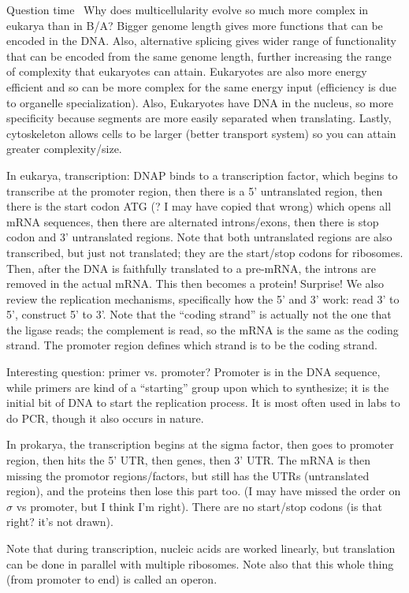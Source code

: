 \documentclass[12pt]{article}
\begin{document}
Question time~ Why does multicellularity evolve so much more complex in eukarya than in B/A? Bigger genome length gives more functions that can be encoded in the DNA. Also, alternative splicing gives wider range of functionality that can be encoded from the same genome length, further increasing the range of complexity that eukaryotes can attain. Eukaryotes are also more energy efficient and so can be more complex for the same energy input (efficiency is due to organelle specialization). Also, Eukaryotes have DNA in the nucleus, so more specificity because segments are more easily separated when translating. Lastly, cytoskeleton allows cells to be larger (better transport system) so you can attain greater complexity/size.

In eukarya, transcription: DNAP binds to a transcription factor, which begins to transcribe at the promoter region, then there is a 5' untranslated region, then there is the start codon ATG (? I may have copied that wrong) which opens all mRNA sequences, then there are alternated introns/exons, then there is stop codon and 3' untranslated regions. Note that both untranslated regions are also transcribed, but just not translated; they are the start/stop codons for ribosomes. Then, after the DNA is faithfully translated to a pre-mRNA, the introns are removed in the actual mRNA. This then becomes a protein! Surprise! We also review the replication mechanisms, specifically how the 5' and 3' work: read 3' to 5', construct 5' to 3'. Note that the ``coding strand'' is actually not the one that the ligase reads; the complement is read, so the mRNA is the same as the coding strand. The promoter region defines which strand is to be the coding strand. 

Interesting question: primer vs. promoter? Promoter is in the DNA sequence, while primers are kind of a ``starting'' group upon which to synthesize; it is the initial bit of DNA to start the replication process. It is most often used in labs to do PCR, though it also occurs in nature. 

In prokarya, the transcription begins at the sigma factor, then goes to promoter region, then hits the 5' UTR, then genes, then 3' UTR. The mRNA is then missing the promotor regions/factors, but still has the UTRs (untranslated region), and the proteins then lose this part too. (I may have missed the order on $\sigma$ vs promoter, but I think I'm right). There are no start/stop codons (is that right? it's not drawn). 

Note that during transcription, nucleic acids are worked linearly, but translation can be done in parallel with multiple ribosomes. Note also that this whole thing (from promoter to end) is called an operon.
\end{document}
